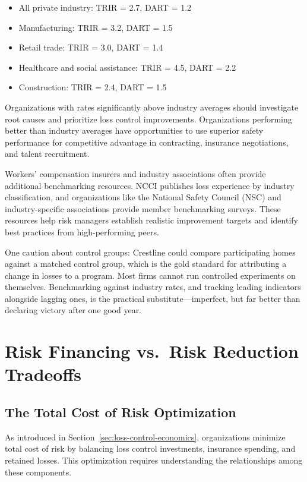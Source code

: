 \documentclass[11pt,openany]{book}
\providecommand{\tightlist}{\setlength{\itemsep}{0pt}\setlength{\parskip}{0pt}}
\begin{document}
\begin{itemize}\tightlist
  \item All private industry: TRIR = 2.7, DART = 1.2
  \item Manufacturing: TRIR = 3.2, DART = 1.5
  \item Retail trade: TRIR = 3.0, DART = 1.4
  \item Healthcare and social assistance: TRIR = 4.5, DART = 2.2
  \item Construction: TRIR = 2.4, DART = 1.5
\end{itemize}

Organizations with rates significantly above industry averages should
investigate root causes and prioritize loss control improvements.
Organizations performing better than industry averages have opportunities to
use superior safety performance for competitive advantage in contracting,
insurance negotiations, and talent recruitment.

Workers' compensation insurers and industry associations often provide
additional benchmarking resources. NCCI publishes loss experience by industry
classification, and organizations like the National Safety Council (NSC) and
industry-specific associations provide member benchmarking surveys. These
resources help risk managers establish realistic improvement targets and
identify best practices from high-performing peers.

One caution about control groups: Crestline could compare participating homes
against a matched control group, which is the gold standard for attributing a
change in losses to a program. Most firms cannot run controlled experiments on
themselves. Benchmarking against industry rates, and tracking leading
indicators alongside lagging ones, is the practical substitute---imperfect,
but far better than declaring victory after one good year.

\section{Risk Financing vs.\ Risk Reduction Tradeoffs}
\label{sec:financing-tradeoffs}

\subsection{The Total Cost of Risk Optimization}

As introduced in Section~\ref{sec:loss-control-economics}, organizations
minimize total cost of risk by balancing loss control investments, insurance
spending, and retained losses. This optimization requires understanding the
relationships among these components.
\end{document}
